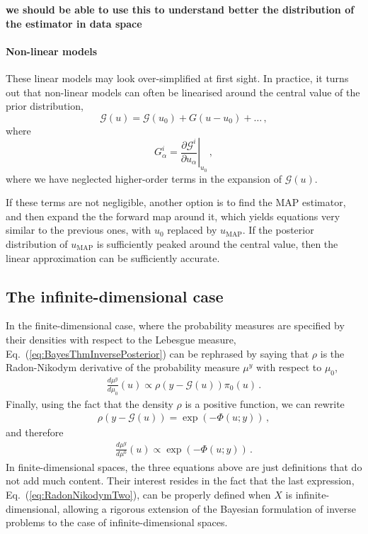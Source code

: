 {\bf we should be able to use this to understand better the distribution of the estimator in data space} 

\paragraph{Non-linear models}

These linear models may look over-simplified at first sight. In practice, it
turns out that non-linear models can often be linearised around the central
value of the prior distribution, 
\begin{equation}
  \label{eq:LinU0}
  \mathcal{G}(u) = \mathcal{G}(u_0) + G \left(u - u_0\right) + \ldots\, ,
\end{equation}
where 
\begin{equation}
  \label{eq:FirstDerU0}
  G^i_\alpha = \left. \frac{\partial \mathcal{G}^i}{\partial u_\alpha} \right|_{u_0}\, ,
\end{equation}
where we have neglected higher-order terms in the expansion of $\mathcal{G}(u)$.

If these terms are not negligible, another option is to find the MAP estimator,
and then expand the the forward map around it, which yields equations very
similar to the previous ones, with $u_0$ replaced by $u_\mathrm{MAP}$. If the
posterior distribution of $u_\mathrm{MAP}$ is sufficiently peaked around the
central value, then the linear approximation can be sufficiently accurate. 


\subsection{The infinite-dimensional case}
\label{sec:infin-dimens-case}

In the finite-dimensional case, where the probability measures are specified by
their densities with respect to the Lebesgue measure,
Eq.~(\ref{eq:BayesThmInversePosterior}) can be rephrased by saying  that $\rho$
is the Radon-Nikodym derivative of the probability measure $\mu^y$ with respect
to $\mu_0$, \viz
\begin{align}
  \label{eq:RadonNikodym}
  \frac{d\mu^y}{d\mu_0} (u) \propto \rho(y-\mathcal G(u)) \pi_0(u)\, .
\end{align}
Finally, using the fact that the density $\rho$ is a positive
function, we can rewrite 
\begin{align}
  \label{eq:PotentialDef}
  \rho(y-\mathcal G(u)) = \exp\left(-\Phi(u;y)\right)\, ,
\end{align}
and therefore
\begin{align}
  \label{eq:RadonNikodymTwo}
  \frac{d\mu^y}{d\mu^0} (u) \propto \exp\left(-\Phi(u;y)\right)\, .
\end{align}
In finite-dimensional spaces, the three equations above are just definitions
that do not add much content. Their interest resides in the fact that the last
expression, Eq.~(\ref{eq:RadonNikodymTwo}), can be properly defined when $X$ is
infinite-dimensional, allowing a rigorous extension of the Bayesian formulation
of inverse problems to the case of infinite-dimensional spaces. 

